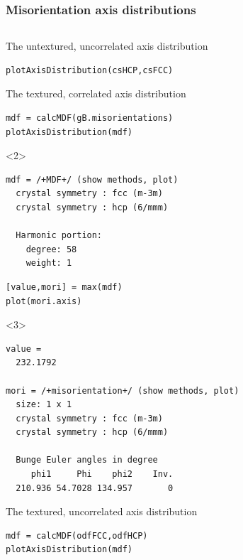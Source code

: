 \documentclass[compress]{beamer}
\begin{document}
\begin{frame}[fragile]
  \frametitle{Misorientation axis distributions}


\begin{columns}

  \begin{column}{0.67\textwidth}
    \begin{overlayarea}{\textwidth}{\textheight}

      The untextured, uncorrelated axis distribution
      \vspace{-0.2cm}
    \begin{lstlisting}[style=input]
plotAxisDistribution(csHCP,csFCC)
\end{lstlisting}

\pause

The textured, correlated axis distribution
\vspace{-0.2cm}
\begin{lstlisting}[style=input]
mdf = calcMDF(gB.misorientations)
plotAxisDistribution(mdf)
\end{lstlisting}
\begin{onlyenv}<2>
  \vspace{-0.3cm}
  \begin{lstlisting}[style=output]
mdf = /+MDF+/ (show methods, plot)
  crystal symmetry : fcc (m-3m)
  crystal symmetry : hcp (6/mmm)

  Harmonic portion:
    degree: 58
    weight: 1
\end{lstlisting}
\end{onlyenv}
\pause

\begin{lstlisting}[style=input]
[value,mori] = max(mdf)
plot(mori.axis)
\end{lstlisting}
\begin{onlyenv}<3>
  \vspace{-0.3cm}
\begin{lstlisting}[style=output]
value =
  232.1792

mori = /+misorientation+/ (show methods, plot)
  size: 1 x 1
  crystal symmetry : fcc (m-3m)
  crystal symmetry : hcp (6/mmm)

  Bunge Euler angles in degree
     phi1     Phi    phi2    Inv.
  210.936 54.7028 134.957       0
\end{lstlisting}
\end{onlyenv}
\pause

The textured, uncorrelated axis distribution
\vspace{-0.2cm}
\begin{lstlisting}[style=input]
mdf = calcMDF(odfFCC,odfHCP)
plotAxisDistribution(mdf)
\end{lstlisting}
\begin{lstlisting}[style=output]


\end{lstlisting}
\end{overlayarea}
\end{column}
\end{columns}
\end{frame}
\end{document}
